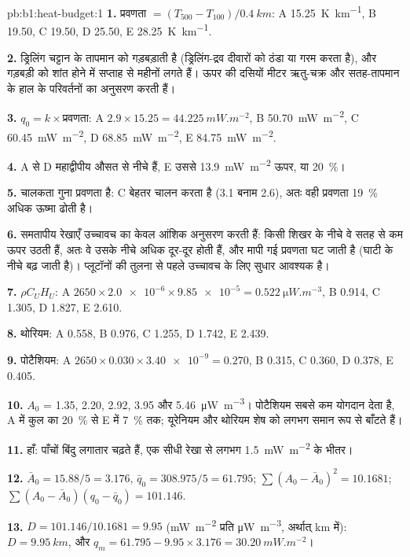 \begin{solution}{pb:b1:heat-budget:1}
\textbf{1.} प्रवणता $= (T_{500} - T_{100})/\qty{0.4}{km}$: A \qty{15.25}{K.km^{-1}},
B \num{19.50}, C \num{19.50}, D \num{25.50}, E \qty{28.25}{K.km^{-1}}.

\textbf{2.} ड्रिलिंग चट्टान के तापमान को गड़बड़ाती है (ड्रिलिंग-द्रव दीवारों को ठंडा या गरम करता है), और गड़बड़ी को शांत होने में सप्ताह से महीनों लगते हैं। ऊपर की दसियों मीटर ऋतु-चक्र और सतह-तापमान के हाल के परिवर्तनों का अनुसरण करती हैं।

\textbf{3.} $q_0 = k\times$प्रवणता: A $2.9\times15.25 = \qty{44.225}{mW.m^{-2}}$,
B \qty{50.70}{mW.m^{-2}}, C \qty{60.45}{mW.m^{-2}}, D \qty{68.85}{mW.m^{-2}},
E \qty{84.75}{mW.m^{-2}}.

\textbf{4.} A से D महाद्वीपीय औसत से नीचे हैं, E उससे \qty{13.9}{mW.m^{-2}} ऊपर, या \qty{20}{\percent}।

\textbf{5.}  चालकता गुना प्रवणता है: C बेहतर चालन करता है (3.1 बनाम 2.6), अतः वही प्रवणता \qty{19}{\percent} अधिक ऊष्मा ढोती है।

\textbf{6.} समतापीय रेखाएँ उच्चावच का केवल आंशिक अनुसरण करती हैं: किसी शिखर के नीचे वे सतह से कम ऊपर उठती हैं, अतः वे उसके नीचे अधिक दूर-दूर होती हैं, और मापी गई प्रवणता घट जाती है (घाटी के नीचे बढ़ जाती है)। प्लूटॉनों की तुलना से पहले उच्चावच के लिए सुधार आवश्यक है।

\textbf{7.} $\rho C_U H_U$: A $2650\times\num{2.0e-6}\times\num{9.85e-5} =
\qty{0.522}{\micro W.m^{-3}}$, B 0.914, C 1.305, D 1.827, E 2.610.

\textbf{8.} थोरियम: A 0.558, B 0.976, C 1.255, D 1.742, E 2.439.

\textbf{9.} पोटैशियम: A $2650\times0.030\times\num{3.40e-9} = 0.270$, B 0.315,
C 0.360, D 0.378, E 0.405.

\textbf{10.} $A_0$ = 1.35, 2.20, 2.92, 3.95 और \qty{5.46}{\micro W.m^{-3}}।
पोटैशियम सबसे कम योगदान देता है, A में कुल का \qty{20}{\percent} से E में \qty{7}{\percent} तक; यूरेनियम और थोरियम शेष को लगभग समान रूप से बाँटते हैं।

\textbf{11.} हाँ: पाँचों बिंदु लगातार चढ़ते हैं, एक सीधी रेखा से लगभग
\qty{1.5}{mW.m^{-2}} के भीतर।

\textbf{12.} $\bar A_0 = 15.88/5 = 3.176$, $\bar q_0 = 308.975/5 = 61.795$;
$\sum(A_0 - \bar A_0)^2 = 10.1681$; $\sum(A_0 - \bar A_0)(q_0 - \bar q_0) =
101.146$.

\textbf{13.} $D = 101.146/10.1681 = 9.95$ (\unit{mW.m^{-2}} प्रति
\unit{\micro W.m^{-3}}, अर्थात् km में): $D = \qty{9.95}{km}$, और $q_m = 61.795 -
9.95\times3.176 = \qty{30.20}{mW.m^{-2}}$।


\end{solution}

